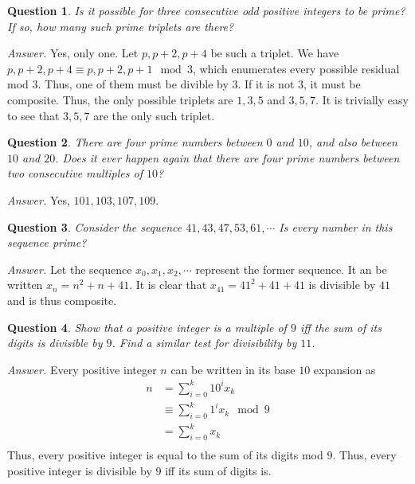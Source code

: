 \documentclass{article}
\newtheorem{question}{Question}
\newenvironment{answer}{\par\noindent\textit{Answer.}}{\par}
\begin{document}
\begin{question}
    Is it possible for three consecutive odd positive integers to be prime?
    If so, how many such prime triplets are there?
\end{question}

\begin{answer}
    Yes, only one. 
    Let $p,p+2,p+4$ be such a triplet.
    We have $p,p+2,p+4 \equiv p,p+2,p+1 \mod 3$,
    which enumerates every possible residual mod $3$.
    Thus, one of them must be divible by $3$.
    If it is not $3$, it must be composite.
    Thus, the only possible triplets are $1,3,5$ and $3,5,7$.
    It is trivially easy to see that $3,5,7$ are the only such triplet.
\end{answer}

\begin{question}
There are four prime numbers between $0$ and $10$, and also between $10$ and $20$.
Does it ever happen again that there are four prime numbers between two consecutive multiples of $10$?
\end{question}

\begin{answer}
    Yes, $101,103,107,109$.
\end{answer}

\begin{question}
Consider the sequence $41,43,47,53,61,\cdots$ 
Is every number in this sequence prime?
\end{question}

\begin{answer}
    Let the sequence $x_{0},x_{1},x_{2},\cdots$ represent the former sequence.
    It an be written $x_n = n^{2} + n + 41$.
    It is clear that $x_{41} = 41^{2} + 41 + 41$ is divisible by $41$ and is thus composite.
\end{answer}

\begin{question}
Show that a positive integer is a multiple of $9$ iff
the sum of its digits is divisible by $9$.
Find a similar test for divisibility by $11$.
\end{question}

\begin{answer}
    Every positive integer $n$ can be written in its base $10$ expansion as
    \[
        \begin{aligned}
            n &= \sum\limits_{i=0}^{k} 10^{i}x_k \\
              &\equiv \sum_{i=0}^{k} 1^{i}x_k \mod 9 \\
              &= \sum_{i=0}^{k} x_k \\
        \end{aligned}
    \]
    Thus, every positive integer is equal to the sum of its digits mod $9$.
    Thus, every positive integer is divisible by $9$ iff its sum of digits is.
\end{answer}
\end{document}
